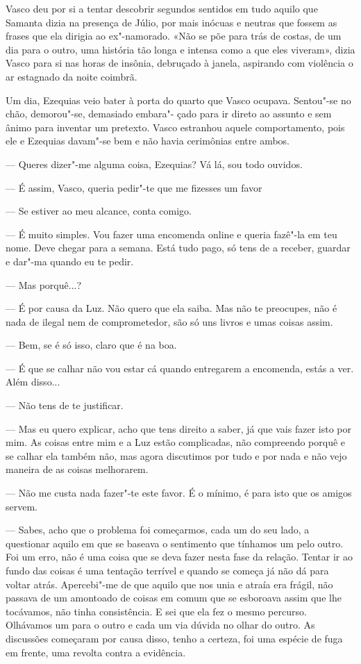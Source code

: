 Vasco deu por si a tentar descobrir segundos sentidos em tudo aquilo que
Samanta dizia na presença de Júlio, por mais inócuas e neutras que
fossem as frases que ela dirigia ao ex"-namorado. «Não se põe para trás
de costas, de um dia para o outro, uma história tão longa e intensa como
a que eles viveram», dizia Vasco para si nas horas de insônia, debruçado
à janela, aspirando com violência o ar estagnado da noite coimbrã.

Um dia, Ezequias veio bater à porta do quarto que Vasco
ocupava. Sentou"-se no chão, demorou"-se, demasiado embara"- çado para ir
direto ao assunto e sem ânimo para inventar um pretexto. Vasco
estranhou aquele comportamento, pois ele e Ezequias davam"-se bem e não
havia cerimônias entre ambos.

--- Queres dizer"-me alguma coisa, Ezequias? Vá lá, sou todo ouvidos.

--- É assim, Vasco, queria pedir"-te que me fizesses um favor

--- Se estiver ao meu alcance, conta comigo.

--- É muito simples. Vou fazer uma encomenda online e
queria fazê"-la em teu nome. Deve chegar para a semana. Está
tudo pago, só tens de a receber, guardar e dar"-ma quando eu
te pedir.

--- Mas porquê...?

--- É por causa da Luz. Não quero que ela saiba. Mas não
te preocupes, não é nada de ilegal nem de comprometedor, são
só uns livros e umas coisas assim.

--- Bem, se é só isso, claro que é na boa.

--- É que se calhar não vou estar cá quando entregarem a
encomenda, estás a ver. Além disso...

--- Não tens de te justificar.

--- Mas eu quero explicar, acho que tens direito a saber, já
que vais fazer isto por mim. As coisas entre mim e a Luz estão
complicadas, não compreendo porquê e se calhar ela também
não, mas agora discutimos por tudo e por nada e não vejo
maneira de as coisas melhorarem.

--- Não me custa nada fazer"-te este favor. É o mínimo, é
para isto que os amigos servem.

--- Sabes, acho que o problema foi começarmos, cada um
do seu lado, a questionar aquilo em que se baseava o sentimento
que tínhamos um pelo outro. Foi um erro, não é uma coisa que se
deva fazer nesta fase da relação. Tentar ir ao fundo das
coisas é uma tentação terrível e quando se começa já não dá para voltar
atrás. Apercebi"-me de que aquilo que nos unia e atraía era frágil, não
passava de um amontoado de coisas em comum que se esboroava assim que
lhe tocávamos, não tinha consistência. E sei que ela fez o mesmo
percurso. Olhávamos um para o outro e cada um via dúvida no olhar do
outro. As discussões começaram por causa disso, tenho a certeza, foi uma
espécie de fuga em frente, uma revolta contra a evidência.

